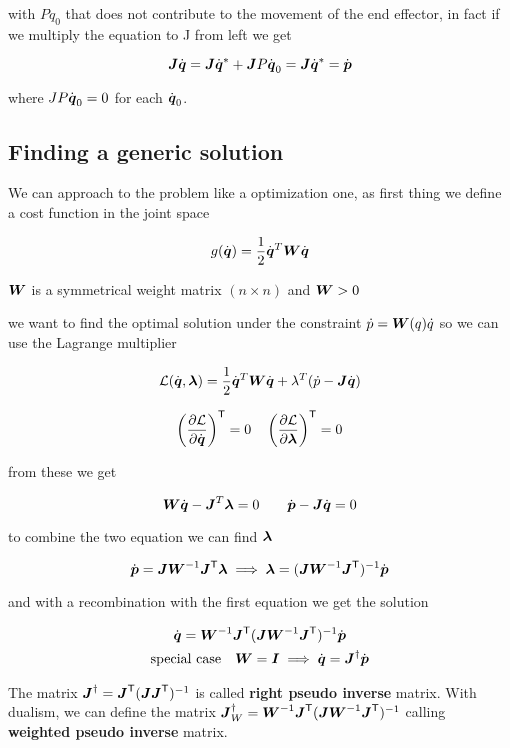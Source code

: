 with $P \dot{q}_0$ that does not contribute to the movement of the end effector, in fact if we multiply the equation to J from left we get

\[ \boldsymbol{J}\dot{\boldsymbol{q}} = \boldsymbol{J}\dot{\boldsymbol{q}}^* + \boldsymbol{J} P \dot{\boldsymbol{q}}_0 = \boldsymbol{J} \dot{\boldsymbol{q}}^* = \dot{\boldsymbol{p}} \]

where $J P \dot{\boldsymbol{q}}_0 = 0$ for each $\dot{\boldsymbol{q}}_0$.

\subsection{Finding a generic solution}

We can approach to the problem like a optimization one, as first thing we define a cost function in the joint space

\[ g(\dot{\boldsymbol{q}}) = \frac{1}{2} \dot{\boldsymbol{q}}^T \boldsymbol{W} \dot{\boldsymbol{q}} \]

$\boldsymbol{W}$ is a symmetrical weight matrix $(n \times n)$ and $\boldsymbol{W} > 0$

we want to find the optimal solution under the constraint $\dot{p} = \boldsymbol{W}(q) \dot{q}$ so we can use the Lagrange multiplier

\[ \mathcal{L}(\dot{\boldsymbol{q}}, \boldsymbol{\lambda}) = \frac{1}{2} \dot{\boldsymbol{q}}^T \boldsymbol{W} \dot{\boldsymbol{q}} + \lambda^T (\dot{p} - \boldsymbol{J} \dot{\boldsymbol{q}})\]

\[
	\left(\frac{\partial \mathcal{L}}{\partial \dot{\boldsymbol{q}}}\right)^{\mathsf{T}} = 0 \quad
	\left(\frac{\partial \mathcal{L}}{\partial \boldsymbol{\lambda}}\right)^{\mathsf{T}} = 0
\]

from these we get

\[ \boldsymbol{W}\dot{\boldsymbol{q}} - \boldsymbol{J}^T\boldsymbol{\lambda} = 0 \qquad \dot{\boldsymbol{p}} - \boldsymbol{J}\dot{\boldsymbol{q}} = 0 \]

to combine the two equation we can find $\boldsymbol{\lambda}$

\[
\dot{\boldsymbol{p}} = \boldsymbol{J}\boldsymbol{W}^{-1}\boldsymbol{J}^{\mathsf{T}} \boldsymbol{\lambda} \implies
\boldsymbol{\lambda} = (\boldsymbol{J}\boldsymbol{W}^{-1}\boldsymbol{J}^{\mathsf{T}})^{-1} \dot{\boldsymbol{p}}
\]

and with a recombination with the first equation we get the solution

\begin{gather*}
	\dot{\boldsymbol{q}} = \boldsymbol{W}^{-1} \boldsymbol{J}^{\mathsf{T}} (\boldsymbol{J}\boldsymbol{W}^{-1}\boldsymbol{J}^{\mathsf{T}})^{-1} \dot{\boldsymbol{p}} \\
	\text{special case} \quad \boldsymbol{W} = \boldsymbol{I} \implies \dot{\boldsymbol{q}} = \boldsymbol{J}^\dag \dot{\boldsymbol{p}}
\end{gather*}

The matrix $\boldsymbol{J}^\dag = \boldsymbol{J}^{\mathsf{T}} (\boldsymbol{J}\boldsymbol{J}^{\mathsf{T}})^{-1}$ is called \textbf{right pseudo inverse} matrix.
With dualism, we can define the matrix $\boldsymbol{J}^\dag_W = \boldsymbol{W}^{-1} \boldsymbol{J}^{\mathsf{T}} (\boldsymbol{J}\boldsymbol{W}^{-1}\boldsymbol{J}^{\mathsf{T}})^{-1}$ calling \textbf{weighted pseudo inverse} matrix.

